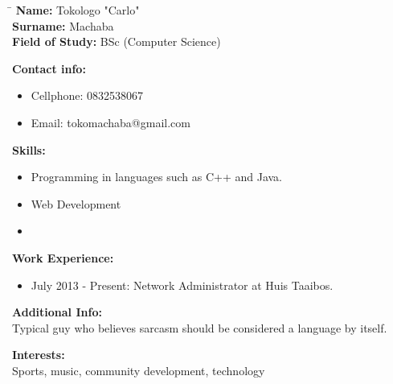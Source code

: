 \documentclass[12pt]{article}
\begin{document}
	\begin{flushleft}
		\begin{tabbing}
			\hspace*{4cm}\=\hspace*{3cm}\kill
			\textbf{Name:} \> Tokologo "Carlo"\\	
			\textbf{Surname:} \> Machaba \\
			\textbf{Field of Study:} \> BSc (Computer Science)
		\end{tabbing}
		
		\textbf{Contact info:}	
		\begin{itemize}
			\item Cellphone: 0832538067
			\item Email: tokomachaba@gmail.com
		\end{itemize}
		
	
	
		\textbf{Skills:}
		\begin{itemize}
			\item Programming in languages such as C++ and Java.
			\item Web Development
			\item 
		\end{itemize}
	
		\textbf{Work Experience:}
		\begin{itemize}
			\item July 2013 - Present: Network Administrator at Huis Taaibos.
		\end{itemize}
	
		\textbf{Additional Info:} \\
		\vspace{0.1in}
	 	Typical guy who believes sarcasm should be considered a language by itself.\\
		\vspace{0.1in}
		
		\textbf{Interests:} \\
		\vspace{0.1in}
	 Sports, music, community development, technology  \\
	 	\vspace{0.1in}
	\end{flushleft}
\end{document}

